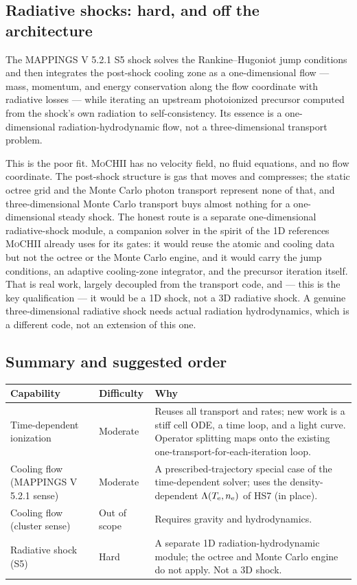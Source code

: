 \documentclass[english,a4paper]{my_memo}
\newcommand{\MoCHII}{\textsc{MoCHII}}
\newcommand{\Mappings}{MAPPINGS V 5.2.1}
\newcommand{\Te}{T_{\rm e}}
\newcommand{\nelec}{n_{\rm e}}
\begin{document}
\subsection{Radiative shocks: hard, and off the architecture}

The \Mappings{} S5 shock solves the Rankine--Hugoniot jump conditions and
then integrates the post-shock cooling zone as a one-dimensional flow ---
mass, momentum, and energy conservation along the flow coordinate with
radiative losses --- while iterating an upstream photoionized precursor
computed from the shock's own radiation to self-consistency.  Its essence
is a one-dimensional radiation-hydrodynamic flow, not a three-dimensional
transport problem.

This is the poor fit.  \MoCHII{} has no velocity field, no fluid
equations, and no flow coordinate.  The post-shock structure is gas that
moves and compresses; the static octree grid and the Monte Carlo photon
transport represent none of that, and three-dimensional Monte Carlo
transport buys almost nothing for a one-dimensional steady shock.  The
honest route is a separate one-dimensional radiative-shock module, a
companion solver in the spirit of the 1D references \MoCHII{} already uses
for its gates: it would reuse the atomic and cooling data but not the
octree or the Monte Carlo engine, and it would carry the jump conditions,
an adaptive cooling-zone integrator, and the precursor iteration itself.
That is real work, largely decoupled from the transport code, and --- this
is the key qualification --- it would be a 1D shock, not a 3D radiative
shock.  A genuine three-dimensional radiative shock needs actual radiation
hydrodynamics, which is a different code, not an extension of this one.

\subsection{Summary and suggested order}

\begin{center}
\begin{tabular}{P{0.26\textwidth}P{0.16\textwidth}P{0.44\textwidth}}
\toprule
Capability & Difficulty & Why \\
\midrule
Time-dependent ionization & Moderate &
  Reuses all transport and rates; new work is a stiff cell ODE, a time
  loop, and a light curve.  Operator splitting maps onto the existing
  one-transport-for-each-iteration loop. \\
Cooling flow (\Mappings{} sense) & Moderate &
  A prescribed-trajectory special case of the time-dependent solver;
  uses the density-dependent $\Lambda(\Te,\nelec)$ of HS7 (in place). \\
Cooling flow (cluster sense) & Out of scope &
  Requires gravity and hydrodynamics. \\
Radiative shock (S5) & Hard &
  A separate 1D radiation-hydrodynamic module; the octree and Monte Carlo
  engine do not apply.  Not a 3D shock. \\
\bottomrule
\end{tabular}
\end{center}
\end{document}

